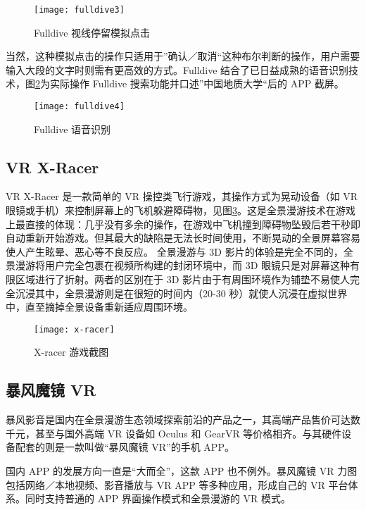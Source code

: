 \begin{figure}[htp]
\centering
\texttt{[image: fulldive3]}
\caption{Fulldive 视线停留模拟点击}
\label{fig:fulldive3}
\end{figure}

当然，这种模拟点击的操作只适用于”确认／取消“这种布尔判断的操作，用户需要输入大段的文字时则需有更高效的方式。Fulldive 结合了已日益成熟的语音识别技术，图\ref{fig:fulldive4}为实际操作 Fulldive 搜索功能并口述”中国地质大学“后的 APP 截屏。

\begin{figure}[htp]
\centering
\texttt{[image: fulldive4]}
\caption{Fulldive 语音识别}
\label{fig:fulldive4}
\end{figure}

\subsection{VR X-Racer}

VR X-Racer 是一款简单的 VR 操控类飞行游戏，其操作方式为晃动设备（如 VR 眼镜或手机）来控制屏幕上的飞机躲避障碍物，见图\ref{fig:x-racer}。这是全景漫游技术在游戏上最直接的体现：几乎没有多余的操作，在游戏中飞机撞到障碍物坠毁后若干秒即自动重新开始游戏。但其最大的缺陷是无法长时间使用，不断晃动的全景屏幕容易使人产生眩晕、恶心等不良反应。
全景漫游与 3D 影片的体验是完全不同的，全景漫游将用户完全包裹在视频所构建的封闭环境中，而 3D 眼镜只是对屏幕这种有限区域进行了折射。两者的区别在于 3D 影片由于有周围环境作为铺垫不易使人完全沉浸其中，全景漫游则是在很短的时间内（20-30 秒）就使人沉浸在虚拟世界中，直至摘掉全景设备重新适应周围环境。

\begin{figure}[htp]
\centering
\texttt{[image: x-racer]}
\caption{X-racer 游戏截图}
\label{fig:x-racer}
\end{figure}

\subsection{暴风魔镜 VR}

暴风影音是国内在全景漫游生态领域探索前沿的产品之一，其高端产品售价可达数千元，甚至与国外高端 VR 设备如 Oculus 和 GearVR 等价格相齐。与其硬件设备配套的则是一款叫做“暴风魔镜 VR”的手机 APP。

国内 APP 的发展方向一直是“大而全”，这款 APP 也不例外。暴风魔镜 VR 力图包括网络／本地视频、影音播放与 VR APP 等多种应用，形成自己的 VR 平台体系。同时支持普通的 APP 界面操作模式和全景漫游的 VR 模式。


